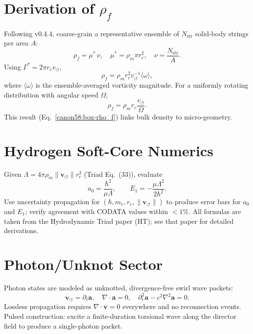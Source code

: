 \documentclass[10pt,reprint,aps,onecolumn,nofootinbib]{revtex4-2}
\begin{document}
    \section{Derivation of $\rho_{\!f}$}
    \label{canon58:appC}
    Following v0.4.4, coarse-grain a representative ensemble of $N_{\mathrm{str}}$
    solid-body strings per area $A$:
    \[
        \rho_{\!f} = \mu^{*}\,\nu, \quad
        \mu^{*} = \rho_{\!m} \pi r_c^{2}, \quad
        \nu = \frac{N_{\mathrm{str}}}{A}.
    \]
    Using $\Gamma^{*} = 2\pi r_c v_{\!\boldsymbol{\circlearrowleft}}$,
    \[
        \rho_{\!f} = \rho_{\!m} r_c^{2} v_{\!\boldsymbol{\circlearrowleft}}^{-1} \langle \omega \rangle,
    \]
    where $\langle \omega \rangle$ is the ensemble-averaged vorticity magnitude.
    For a uniformly rotating distribution with angular speed $\Omega$,
    \[
        \rho_{\!f} = \rho_{\!m} r_c \frac{v_{\!\boldsymbol{\circlearrowleft}}}{\Omega}.
    \]
    This result (Eq.~\eqref{canon58:box-rho_f}) links bulk density to micro-geometry.

    \section{Hydrogen Soft-Core Numerics}
    \label{canon58:appD}
    Given $\Lambda = 4\pi \rho_{\!m} \lVert \mathbf{v}_{\!\boldsymbol{\circlearrowleft}}\rVert r_c^{3}$ (Triad Eq.~(33)),
    evaluate
    \[
        a_0 = \frac{\hbar^{2}}{\mu \Lambda}, \qquad
        E_1 = - \frac{\mu \Lambda^{2}}{2\hbar^{2}}.
    \]
    Use uncertainty propagation for $(\hbar, m_e, r_c, \lVert \mathbf{v}_{\!\boldsymbol{\circlearrowleft}}\rVert)$ to
    produce error bars for $a_0$ and $E_1$; verify agreement with CODATA values
    within $<1\%$. All formulas are taken from the Hydrodynamic Triad paper (HT); see that paper for detailed derivations.

    \section{Photon/Unknot Sector}
    \label{canon58:appE}
    Photon states are modeled as unknotted, divergence-free swirl wave packets:
    \[
        \mathbf{v}_{\!\boldsymbol{\circlearrowleft}} = \partial_t \mathbf{a}, \quad
        \nabla \cdot \mathbf{a} = 0, \quad
        \partial_t^{2}\mathbf{a} - c^{2}\nabla^{2}\mathbf{a} = 0.
    \]
    Lossless propagation requires $\nabla\cdot\mathbf{v}=0$ everywhere and
    no reconnection events. Pulsed construction: excite a finite-duration
    torsional wave along the director field to produce a single-photon packet.
\end{document}
